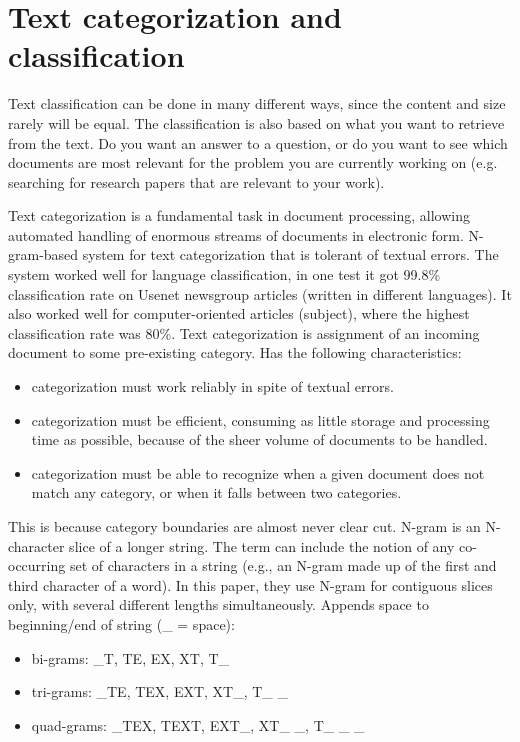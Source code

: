\section{Text categorization and classification}
\label{sec:text_classification}
Text classification can be done in many different ways, since the content and size rarely will be equal. 
The classification is also based on what you want to retrieve from the text. 
Do you want an answer to a question, or do you want to see which documents are most relevant for the problem you are currently working on 
(e.g. searching for research papers that are relevant to your work).




Text categorization is a fundamental task in document processing, allowing automated handling of enormous streams of documents in electronic form. 
N-gram-based system for text categorization that is tolerant of textual errors. 
The system worked well for language classification, in one test it got 99.8\% classification rate on Usenet newsgroup articles (written in different languages). 
It also worked well for computer-oriented articles (subject), where the highest classification rate was 80\%.
Text categorization is assignment of an incoming document to some pre-existing category. 
Has the following characteristics:
\begin{itemize}
	\item categorization must work reliably in spite of textual errors.
	\item categorization must be efficient, consuming as little storage and processing time as possible, because of the sheer volume of documents to be handled.
	\item categorization must be able to recognize when a given document does not match any category, or when it falls between two categories. 
\end{itemize}
This is because category boundaries are almost never clear cut.
N-gram is an N-character slice of a longer string. 
The term can include the notion of any co-occurring set of characters in a string (e.g., an N-gram made up of the first and third character of a word).
In this paper, they use N-gram for contiguous slices only, with several different lengths simultaneously. 
Appends space to beginning/end of string (\_ = space): 
\begin{itemize}
	\item bi-grams: \_T, TE, EX, XT, T\_
	\item tri-grams: \_TE, TEX, EXT, XT\_, T\_ \_
	\item quad-grams: \_TEX, TEXT, EXT\_, XT\_ \_, T\_ \_ \_
\end{itemize}
